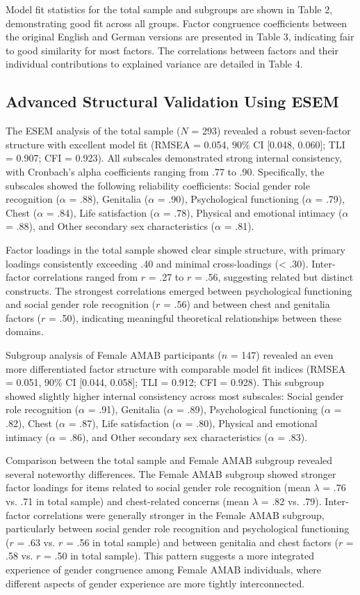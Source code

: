\documentclass[12pt,a4paper]{article}
\begin{document}
Model fit statistics for the total sample and subgroups are shown in Table 2, demonstrating good fit across all groups. Factor congruence coefficients between the original English and German versions are presented in Table 3, indicating fair to good similarity for most factors. The correlations between factors and their individual contributions to explained variance are detailed in Table 4.

\subsection{Advanced Structural Validation Using ESEM}

The ESEM analysis of the total sample ($N$ = 293) revealed a robust seven-factor structure with excellent model fit (RMSEA = 0.054, 90\% CI [0.048, 0.060]; TLI = 0.907; CFI = 0.923). All subscales demonstrated strong internal consistency, with Cronbach's alpha coefficients ranging from .77 to .90. Specifically, the subscales showed the following reliability coefficients: Social gender role recognition ($\alpha$ = .88), Genitalia ($\alpha$ = .90), Psychological functioning ($\alpha$ = .79), Chest ($\alpha$ = .84), Life satisfaction ($\alpha$ = .78), Physical and emotional intimacy ($\alpha$ = .88), and Other secondary sex characteristics ($\alpha$ = .81).

Factor loadings in the total sample showed clear simple structure, with primary loadings consistently exceeding .40 and minimal cross-loadings (< .30). Inter-factor correlations ranged from $r$ = .27 to $r$ = .56, suggesting related but distinct constructs. The strongest correlations emerged between psychological functioning and social gender role recognition ($r$ = .56) and between chest and genitalia factors ($r$ = .50), indicating meaningful theoretical relationships between these domains.

Subgroup analysis of Female AMAB participants ($n$ = 147) revealed an even more differentiated factor structure with comparable model fit indices (RMSEA = 0.051, 90\% CI [0.044, 0.058]; TLI = 0.912; CFI = 0.928). This subgroup showed slightly higher internal consistency across most subscales: Social gender role recognition ($\alpha$ = .91), Genitalia ($\alpha$ = .89), Psychological functioning ($\alpha$ = .82), Chest ($\alpha$ = .87), Life satisfaction ($\alpha$ = .80), Physical and emotional intimacy ($\alpha$ = .86), and Other secondary sex characteristics ($\alpha$ = .83).

Comparison between the total sample and Female AMAB subgroup revealed several noteworthy differences. The Female AMAB subgroup showed stronger factor loadings for items related to social gender role recognition (mean $\lambda$ = .76 vs. .71 in total sample) and chest-related concerns (mean $\lambda$ = .82 vs. .79). Inter-factor correlations were generally stronger in the Female AMAB subgroup, particularly between social gender role recognition and psychological functioning ($r$ = .63 vs. $r$ = .56 in total sample) and between genitalia and chest factors ($r$ = .58 vs. $r$ = .50 in total sample). This pattern suggests a more integrated experience of gender congruence among Female AMAB individuals, where different aspects of gender experience are more tightly interconnected.
\end{document}
